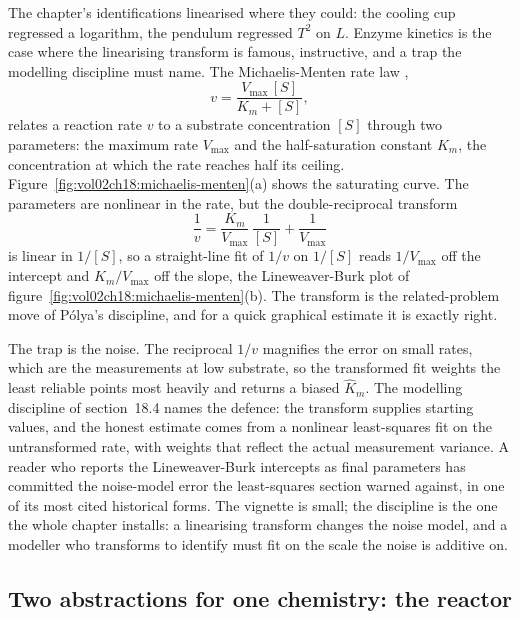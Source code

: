The chapter's identifications linearised where they could: the cooling cup
regressed a logarithm, the pendulum regressed $T^2$ on $L$. Enzyme kinetics
is the case where the linearising transform is famous, instructive, and a
trap the modelling discipline must name. The Michaelis-Menten rate law
\cite{paper:michaelis-menten1913},
\[
v = \frac{V_{\max}\,[S]}{K_m + [S]},
\]
relates a reaction rate $v$ to a substrate concentration $[S]$ through two
parameters: the maximum rate $V_{\max}$ and the half-saturation constant
$K_m$, the concentration at which the rate reaches half its ceiling.
Figure~\ref{fig:vol02ch18:michaelis-menten}(a) shows the saturating curve.
The parameters are nonlinear in the rate, but the double-reciprocal
transform
\[
\frac{1}{v} = \frac{K_m}{V_{\max}}\,\frac{1}{[S]} + \frac{1}{V_{\max}}
\]
is linear in $1/[S]$, so a straight-line fit of $1/v$ on $1/[S]$ reads
$1/V_{\max}$ off the intercept and $K_m/V_{\max}$ off the slope, the
Lineweaver-Burk plot of
figure~\ref{fig:vol02ch18:michaelis-menten}(b). The transform is the
related-problem move of P\'olya's discipline, and for a quick graphical
estimate it is exactly right.

The trap is the noise. The reciprocal $1/v$ magnifies the error on small
rates, which are the measurements at low substrate, so the transformed fit
weights the least reliable points most heavily and returns a biased
$\hat K_m$. The modelling discipline of section~18.4 names the defence: the
transform supplies starting values, and the honest estimate comes from a
nonlinear least-squares fit on the untransformed rate, with weights that
reflect the actual measurement variance. A reader who reports the
Lineweaver-Burk intercepts as final parameters has committed the noise-model
error the least-squares section warned against, in one of its most cited
historical forms. The vignette is small; the discipline is the one the
whole chapter installs: a linearising transform changes the noise model, and
a modeller who transforms to identify must fit on the scale the noise is
additive on.



\subsection{Two abstractions for one chemistry: the reactor}

